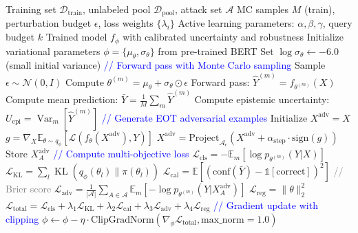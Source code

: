 \documentclass[12pt,a4paper]{article}
\theoremstyle{definition}
\DeclareMathOperator{\KL}{KL}
\DeclareMathOperator{\Var}{Var}
\begin{document}
\begin{algorithm}[H]
\caption{Complete Stochastic Training with EOT and Active Learning}
\label{alg:complete_training}
\begin{algorithmic}[1]
\Require Training set $\mathcal{D}_{\text{train}}$, unlabeled pool $\mathcal{D}_{\text{pool}}$, attack set $\mathcal{A}$
\Require MC samples $M$ (train), perturbation budget $\epsilon$, loss weights $\{\lambda_i\}$
\Require Active learning parameters: $\alpha, \beta, \gamma$, query budget $k$
\Ensure Trained model $f_\phi$ with calibrated uncertainty and robustness
\State Initialize variational parameters $\phi=\{\mu_\theta,\sigma_\theta\}$ from pre-trained BERT
\State Set $\log \sigma_\theta \gets -6.0$ (small initial variance)
    \State \textcolor{blue}{// Forward pass with Monte Carlo sampling}
      \State Sample $\epsilon \sim \mathcal{N}(0, I)$
      \State Compute $\theta^{(m)} = \mu_\theta + \sigma_\theta \odot \epsilon$
      \State Forward pass: $\hat{Y}^{(m)} = f_{\theta^{(m)}}(X)$
    \EndFor
    \State Compute mean prediction: $\bar{Y} = \frac{1}{M}\sum_m \hat{Y}^{(m)}$
    \State Compute epistemic uncertainty: $U_{\text{epi}} = \Var_m[\hat{Y}^{(m)}]$
    \State \textcolor{blue}{// Generate EOT adversarial examples}
      \State Initialize $X^{\text{adv}} = X$
        \State $g = \nabla_X \mathbb{E}_{\theta \sim q_\phi}[\mathcal{L}(f_\theta(X^{\text{adv}}), Y)]$
        \State $X^{\text{adv}} = \text{Project}_{\mathcal{A}_\epsilon}(X^{\text{adv}} + \alpha_{\text{step}} \cdot \text{sign}(g))$
      \EndFor
      \State Store $X^{\text{adv}}_A$
    \EndFor
    \State \textcolor{blue}{// Compute multi-objective loss}
    \State $\mathcal{L}_{\text{cls}} = -\mathbb{E}_m[\log p_{\theta^{(m)}}(Y|X)]$
    \State $\mathcal{L}_{\mathrm{KL}} = \sum_l \KL(q_\phi(\theta_l) \| \pi(\theta_l))$
    \State $\mathcal{L}_{\text{cal}} = \mathbb{E}[(\text{conf}(\bar{Y}) - \mathbb{1}[\text{correct}])^2]$ \quad \textcolor{gray}{// Brier score}
    \State $\mathcal{L}_{\text{adv}} = \frac{1}{|\mathcal{A}|}\sum_{A \in \mathcal{A}} \mathbb{E}_m[-\log p_{\theta^{(m)}}(Y|X^{\text{adv}}_A)]$
    \State $\mathcal{L}_{\text{reg}} = \|\theta\|_2^2$
    \State $\mathcal{L}_{\text{total}} = \mathcal{L}_{\text{cls}} + \lambda_1 \mathcal{L}_{\mathrm{KL}} + \lambda_2 \mathcal{L}_{\text{cal}} + \lambda_3 \mathcal{L}_{\text{adv}} + \lambda_4 \mathcal{L}_{\text{reg}}$
    \State \textcolor{blue}{// Gradient update with clipping}
    \State $\phi \leftarrow \phi - \eta \cdot \text{ClipGradNorm}(\nabla_\phi \mathcal{L}_{\text{total}}, \text{max\_norm}=1.0)$
  \EndFor
\end{algorithmic}
\end{algorithm}
\end{document}
